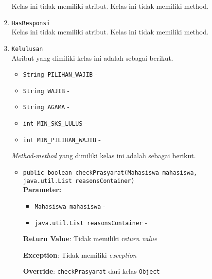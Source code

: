\documentclass{article}
\begin{document}
\begin{enumerate}
Kelas ini tidak memiliki atribut. Kelas ini tidak memiliki method. \item \texttt{HasResponsi}\\ 


Kelas ini tidak memiliki atribut. Kelas ini tidak memiliki method. \item \texttt{Kelulusan}\\ 


Atribut yang dimiliki kelas ini adalah sebagai berikut.
\begin{itemize}
\item \texttt{String PILIHAN\_WAJIB} - 
\item \texttt{String WAJIB} - 
\item \texttt{String AGAMA} - 
\item \texttt{int MIN\_SKS\_LULUS} - 
\item \texttt{int MIN\_PILIHAN\_WAJIB} - 
\end{itemize}
\textit{Method-method} yang dimiliki kelas ini adalah sebagai berikut.
\begin{itemize}
\item \texttt{public boolean checkPrasyarat(Mahasiswa mahasiswa, java.util.List reasonsContainer)}\\ 


\textbf{Parameter:}\begin{itemize}
\item \texttt{Mahasiswa mahasiswa} - 
\item \texttt{java.util.List reasonsContainer} - 
\end{itemize}
\textbf{Return Value}: Tidak memiliki \textit{return value}

\textbf{Exception}: Tidak memiliki \textit{exception}

\textbf{Override}: \texttt{checkPrasyarat} dari kelas \texttt{Object}

\end{itemize}
\end{enumerate}
\end{document}
